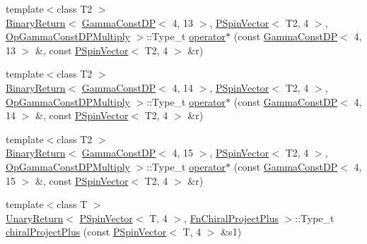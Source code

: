 \begin{DoxyCompactItemize}
\item 
{\footnotesize template$<$class T2 $>$ }\\\mbox{\hyperlink{structENSEM_1_1BinaryReturn}{Binary\+Return}}$<$ \mbox{\hyperlink{classENSEM_1_1GammaConstDP}{Gamma\+Const\+DP}}$<$ 4, 13 $>$, \mbox{\hyperlink{classENSEM_1_1PSpinVector}{P\+Spin\+Vector}}$<$ T2, 4 $>$, \mbox{\hyperlink{structENSEM_1_1OpGammaConstDPMultiply}{Op\+Gamma\+Const\+D\+P\+Multiply}} $>$\+::Type\+\_\+t \mbox{\hyperlink{group__primspinvector_gaa05448d24f9c6526e5785b8c81a604bd}{operator$\ast$}} (const \mbox{\hyperlink{classENSEM_1_1GammaConstDP}{Gamma\+Const\+DP}}$<$ 4, 13 $>$ \&, const \mbox{\hyperlink{classENSEM_1_1PSpinVector}{P\+Spin\+Vector}}$<$ T2, 4 $>$ \&r)
\item 
{\footnotesize template$<$class T2 $>$ }\\\mbox{\hyperlink{structENSEM_1_1BinaryReturn}{Binary\+Return}}$<$ \mbox{\hyperlink{classENSEM_1_1GammaConstDP}{Gamma\+Const\+DP}}$<$ 4, 14 $>$, \mbox{\hyperlink{classENSEM_1_1PSpinVector}{P\+Spin\+Vector}}$<$ T2, 4 $>$, \mbox{\hyperlink{structENSEM_1_1OpGammaConstDPMultiply}{Op\+Gamma\+Const\+D\+P\+Multiply}} $>$\+::Type\+\_\+t \mbox{\hyperlink{group__primspinvector_gad8abbefefdc24a79b3e5e3a161441643}{operator$\ast$}} (const \mbox{\hyperlink{classENSEM_1_1GammaConstDP}{Gamma\+Const\+DP}}$<$ 4, 14 $>$ \&, const \mbox{\hyperlink{classENSEM_1_1PSpinVector}{P\+Spin\+Vector}}$<$ T2, 4 $>$ \&r)
\item 
{\footnotesize template$<$class T2 $>$ }\\\mbox{\hyperlink{structENSEM_1_1BinaryReturn}{Binary\+Return}}$<$ \mbox{\hyperlink{classENSEM_1_1GammaConstDP}{Gamma\+Const\+DP}}$<$ 4, 15 $>$, \mbox{\hyperlink{classENSEM_1_1PSpinVector}{P\+Spin\+Vector}}$<$ T2, 4 $>$, \mbox{\hyperlink{structENSEM_1_1OpGammaConstDPMultiply}{Op\+Gamma\+Const\+D\+P\+Multiply}} $>$\+::Type\+\_\+t \mbox{\hyperlink{group__primspinvector_ga23212ad644650a519a334e7eb30cb99a}{operator$\ast$}} (const \mbox{\hyperlink{classENSEM_1_1GammaConstDP}{Gamma\+Const\+DP}}$<$ 4, 15 $>$ \&, const \mbox{\hyperlink{classENSEM_1_1PSpinVector}{P\+Spin\+Vector}}$<$ T2, 4 $>$ \&r)
\item 
{\footnotesize template$<$class T $>$ }\\\mbox{\hyperlink{structENSEM_1_1UnaryReturn}{Unary\+Return}}$<$ \mbox{\hyperlink{classENSEM_1_1PSpinVector}{P\+Spin\+Vector}}$<$ T, 4 $>$, \mbox{\hyperlink{structENSEM_1_1FnChiralProjectPlus}{Fn\+Chiral\+Project\+Plus}} $>$\+::Type\+\_\+t \mbox{\hyperlink{group__primspinvector_ga2d58ba66261a878c90b4c5dbc1af1863}{chiral\+Project\+Plus}} (const \mbox{\hyperlink{classENSEM_1_1PSpinVector}{P\+Spin\+Vector}}$<$ T, 4 $>$ \&s1)

\end{DoxyCompactItemize}
